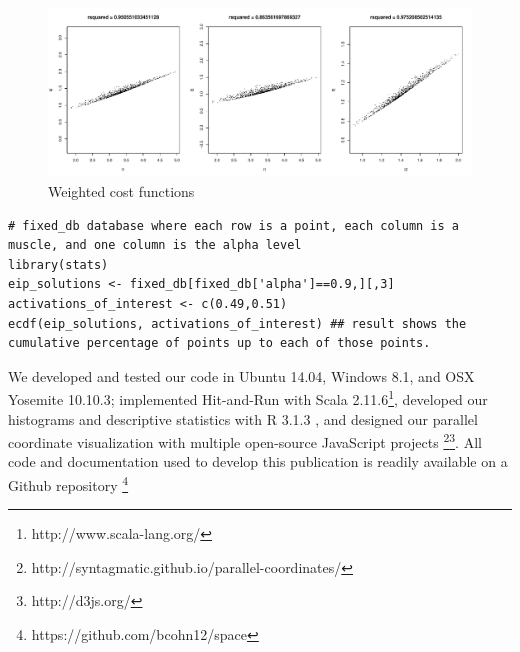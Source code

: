 \begin{figure}[h]
\centering
\includegraphics[width=\textwidth,page=2]{figs/cost_function_scatterplots.pdf}
\caption{Weighted cost functions}
\label{fig:weighted_cost_functions}
\end{figure}
\begin{verbatim}
# fixed_db database where each row is a point, each column is a muscle, and one column is the alpha level
library(stats)
eip_solutions <- fixed_db[fixed_db['alpha']==0.9,][,3]
activations_of_interest <- c(0.49,0.51)
ecdf(eip_solutions, activations_of_interest) ## result shows the cumulative percentage of points up to each of those points.
\end{verbatim}

We developed and tested our code in  Ubuntu 14.04, Windows 8.1, and OSX Yosemite 10.10.3; implemented Hit-and-Run with Scala 2.11.6\footnote{http://www.scala-lang.org/}, developed our histograms and descriptive statistics with R 3.1.3 \cite{rCoreCitation}, and designed our parallel coordinate visualization with multiple open-source JavaScript projects \footnote{http://syntagmatic.github.io/parallel-coordinates/}\footnote{http://d3js.org/}. All code and documentation used to develop this publication is readily available on a Github repository \footnote{https://github.com/bcohn12/space}